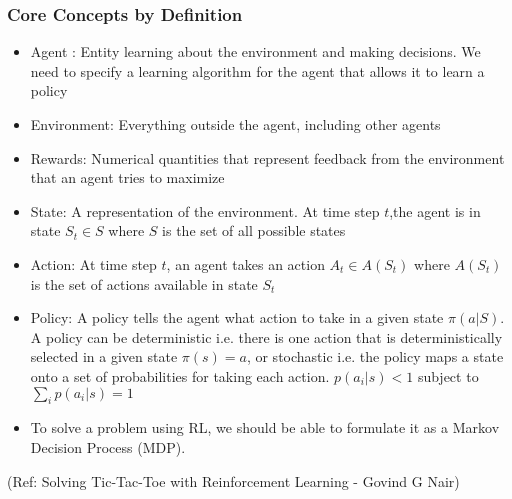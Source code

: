 \begin{frame}[fragile]\frametitle{Core Concepts by Definition}


\begin{itemize}
\item Agent : Entity learning about the environment and making decisions. We need to specify a learning algorithm for the agent that allows it to learn a policy
\item Environment: Everything outside the agent, including other agents
\item Rewards: Numerical quantities that represent feedback from the environment that an agent tries to maximize
\item State: A representation of the environment. At time step $t$,the agent is in state $S_t \in S$ where $S$ is the set of all possible states
\item Action: At time step $t$, an agent takes an action $A_t \in A(S_t)$ where $A(S_t)$ is the set of actions available in state $S_t$
\item Policy: A policy tells the agent what action to take in a given state $\pi(a|S)$. A policy can be deterministic i.e. there is one action that is deterministically selected in a given state $\pi(s)=a$, or stochastic i.e. the policy maps a state onto a set of probabilities for taking each action. $p(a_i|s) < 1$ subject to $\sum_{i} p(a_i|s) = 1$
\item To solve a problem using RL, we should be able to formulate it as a Markov Decision Process (MDP).
\end{itemize}



{\tiny (Ref: Solving Tic-Tac-Toe with Reinforcement Learning - Govind G Nair)}

\end{frame}


